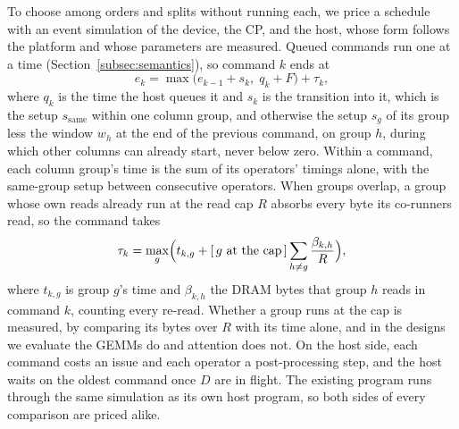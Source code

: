 To choose among orders and splits without running each, we price a schedule with an event simulation of the device, the CP, and the host, whose form follows the platform and whose parameters are measured.
Queued commands run one at a time (Section~\ref{subsec:semantics}), so command $k$ ends at
\begin{equation}
\label{eq:cmd}
e_k = \max\bigl(e_{k-1} + s_k,\; q_k + F\bigr) + \tau_k,
\end{equation}
where $q_k$ is the time the host queues it and $s_k$ is the transition into it, which is the setup $s_\mathrm{same}$ within one column group, and otherwise the setup $s_g$ of its group less the window $w_h$ at the end of the previous command, on group $h$, during which other columns can already start, never below zero.
Within a command, each column group's time is the sum of its operators' timings alone, with the same-group setup between consecutive operators.
When groups overlap, a group whose own reads already run at the read cap $R$ absorbs every byte its co-runners read, so the command takes
\begin{equation}
\label{eq:overlap}
\tau_k = \max_{g}\Bigl(t_{k,g} + [\,g \text{ at the cap}\,]\sum_{h \ne g} \frac{\beta_{k,h}}{R}\Bigr),
\end{equation}
where $t_{k,g}$ is group $g$'s time and $\beta_{k,h}$ the DRAM bytes that group $h$ reads in command $k$, counting every re-read.
Whether a group runs at the cap is measured, by comparing its bytes over $R$ with its time alone, and in the designs we evaluate the GEMMs do and attention does not.
On the host side, each command costs an issue and each operator a post-processing step, and the host waits on the oldest command once $D$ are in flight.
The existing program runs through the same simulation as its own host program, so both sides of every comparison are priced alike.

